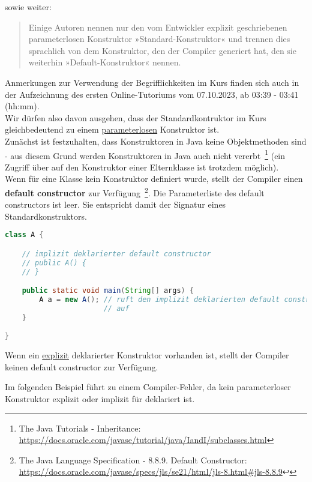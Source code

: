 sowie weiter:

\blockquote[{\cite[517]{Ull12}}]{
    Einige Autoren nennen nur den vom Entwickler explizit geschriebenen parameterlosen Konstruktor »Standard-Konstruktor«
    und trennen dies sprachlich von dem Konstruktor, den der Compiler generiert hat, den sie weiterhin »Default-Konstruktor« nennen.
}

Anmerkungen zur Verwendung der Begrifflichkeiten im Kurs finden sich auch in der Aufzeichnung des ersten Online-Tutoriums
vom 07.10.2023, ab 03:39 - 03:41 (hh:mm).\\

Wir dürfen also davon ausgehen, dass der Standardkontruktor im Kurs gleichbedeutend zu einem \underline{parameterlosen}
Konstruktor ist.\\

Zunächst ist festzuhalten, dass Konstruktoren in Java keine Objektmethoden sind - aus diesem Grund werden Konstruktoren
in Java auch nicht vererbt~\footnote{
    The Java Tutorials - Inheritance: \url{https://docs.oracle.com/javase/tutorial/java/IandI/subclasses.html}
} (ein Zugriff über  auf den Konstruktor einer Elternklasse ist trotzdem möglich).\\

Wenn für eine Klasse kein Konstruktor definiert wurde, stellt der Compiler einen \textbf{default constructor}
zur Verfügung~\footnote{
    The Java Language Specification - 8.8.9. Default Constructor: \url{https://docs.oracle.com/javase/specs/jls/se21/html/jls-8.html#jls-8.8.9}↩
}. Die Parameterliste des default constructors ist leer. Sie entspricht damit der Signatur eines Standardkonstruktors.

\begin{lstlisting}[language=java]
class A {

    // implizit deklarierter default constructor
    // public A() {
    // }

    public static void main(String[] args) {
        A a = new A(); // ruft den implizit deklarierten default constructor
                       // auf
    }

}
\end{lstlisting}

Wenn ein \underline{explizit} deklarierter Konstruktor vorhanden ist, stellt der Compiler keinen default constructor zur Verfügung.

Im folgenden Beispiel führt  zu einem Compiler-Fehler, da kein parameterloser Konstruktor explizit oder implizit für  deklariert ist.

